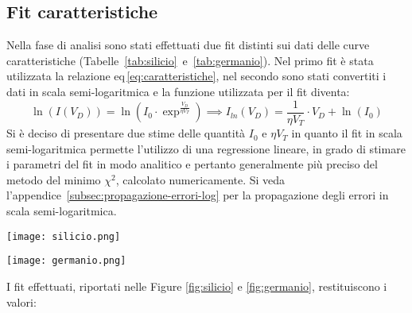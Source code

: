 \documentclass[@SRC@/main]{subfiles}
\begin{document}
    \subsection{Fit caratteristiche}
    Nella fase di analisi sono stati effettuati due fit distinti sui dati delle curve
    caratteristiche (Tabelle~\ref{tab:silicio}~e~\ref{tab:germanio}).
    Nel primo fit è stata utilizzata la relazione eq\,\eqref{eq:caratteristiche}, nel secondo sono stati convertiti i dati in
    scala semi-logaritmica e la funzione utilizzata per il fit diventa:
    \vspace{2}
    \begin{equation*}
        \ln  (I(V_D)) = \ln \left( I_0 \cdot \exp^{\frac{V_D}{\eta V_T}} \right) \implies
        I_{ln}(V_D) = \frac{1}{\eta V_T} \cdot V_D + \ln (I_0)
    \end{equation*}
    \vspace{3}
    \newline
    \noindent Si è deciso di presentare due stime delle quantità $I_{0}$ e $\eta V_{T}$ in quanto il fit in scala semi-logaritmica
    permette l'utilizzo di una regressione lineare, in grado di stimare i parametri del fit in modo analitico e pertanto
    generalmente più preciso del metodo del minimo $\chi^2$, calcolato numericamente.
    Si veda l'appendice~\ref{subsec:propagazione-errori-log} per la propagazione degli
    errori in scala semi-logaritmica.
    \vspace{4}
    \newline
    \begin{center}
        \begin{minipage}{.95\textwidth}
            \centering
            \texttt{[image: silicio.png]}
            \label{fig:silicio}
        \end{minipage}
    \end{center}
\vspace{0.5}
    \begin{center}
        \begin{minipage}[t]{.95\textwidth}
            \centering
            \texttt{[image: germanio.png]}
            \label{fig:germanio}
        \end{minipage}
    \end{center}
\vspace{0.5}
    \newline
    \noindent I fit effettuati, riportati nelle Figure \ref{fig:silicio} e \ref{fig:germanio}, restituiscono i valori:
\end{document}
